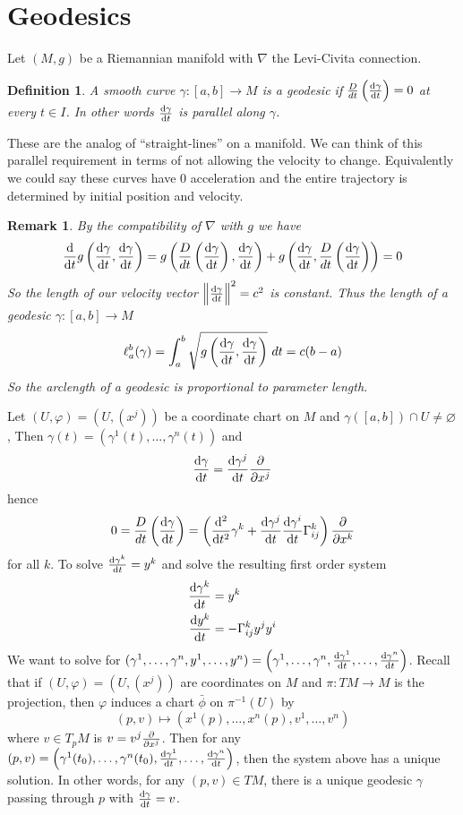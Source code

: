 \documentclass[a4paper]{article}
\newtheorem*{defn}{Definition}
\newtheorem*{rem}{Remark}
\begin{document}
\section*{Geodesics}%
Let $(M,g)$ be a Riemannian manifold with $\nabla$ the Levi-Civita connection.

\begin{defn}
  A smooth curve $\gamma: [a,b] \rightarrow M$ is a geodesic if $\frac{D}{dt} \left( \dv{\gamma}{t} \right) =0$ at every $t \in I$. In other words $\dv{\gamma}{t}$ is parallel along $\gamma$.
\end{defn}
These are the analog of ``straight-lines'' on a manifold. We can think of this parallel requirement in terms of not allowing the velocity to change. Equivalently we could say these curves have 0 acceleration and the entire trajectory is determined by initial position and velocity. 

\begin{rem}
 By the compatibility of $\nabla$ with $g$ we have 
 \[
   \dv{t} g \left( \dv{\gamma}{t}, \dv{\gamma}{t} \right) = g \left( \frac{D}{dt} \left( \dv{\gamma}{t} \right),  \dv{\gamma}{t} \right) + g \left(\dv{\gamma}{t}, \frac{D}{dt} \left( \dv{\gamma}{t} \right)\right) = 0
 \]
 So the length of our velocity vector $\norm{\dv{\gamma}{t}}^2 = c^2$ is constant. Thus the length of a geodesic $\gamma: [a,b] \rightarrow M$
 \[
   \ell_a^b(\gamma) = \int_a^b \sqrt{ g \left( \dv{\gamma}{t}, \dv{\gamma}{t} \right)}\ dt = c(b-a)
 \]
 So the arclength of a geodesic is proportional to parameter length.
\end{rem}

Let $(U,\varphi) = (U, (x^j))$ be a coordinate chart on $M$ and $\gamma([a,b]) \cap U \neq \varnothing$, Then $\gamma(t) = (\gamma^1(t), \dots, \gamma^n(t))$ and 
\[
  \dv{\gamma}{t} = \dv{\gamma^j}{t} \pdv{x^j}
\]
hence 
\[
  0 = \frac{D}{dt} \left( \dv{\gamma}{t} \right) = \left(\dv[2]{t} \gamma^k + \dv{\gamma^j}{t}\dv{\gamma^i}{t} \Gamma_{ij}^k\right) \pdv{x^k}
\]
for all $k$. To solve $\dv{\gamma^k}{t} = y^k$ and solve the resulting first order system
\[
  \begin{aligned}
    \dv{\gamma^k}{t} &= y^k  \\
    \dv{y^k}{t} &= -\Gamma_{ij}^ky^jy^i
  \end{aligned}
\]
We want to solve for $(\gamma^1, \dots, \gamma^n, y^1, \dots, y^n) = \left( \gamma^1, \dots, \gamma^n, \dv{\gamma^1}{t}, \dots, \dv{\gamma^n}{t} \right)$. Recall that if $(U, \varphi) = (U, (x^j))$ are coordinates on $M$ and $\pi: TM \rightarrow M$ is the projection, then $\varphi$ induces a chart $\bar{\phi}$ on $\pi^{-1}(U)$ by 
\[
  (p,v) \mapsto (x^1(p), \dots, x^n(p), v^1, \dots, v^n)
\]
where $v \in T_pM$ is $v = v^j \pdv{x^j}$. Then for any $(p,v) = \left(\gamma^1(t_0), \dots, \gamma^n(t_0),\dv{\gamma^1}{t}(t_0), \dots, \dv{\gamma^n}{t}(t_0)\right)$, then the system above has a unique solution. In other words, for any $(p,v) \in TM$, there is a unique geodesic $\gamma$ passing through $p$ with $\dv{\gamma}{t} = v$.
\end{document}
